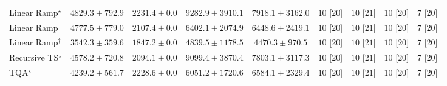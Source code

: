 \begin{tabular}{l|cccc|cccc|}
Linear Ramp$^\star$ & {\cellcolor[HTML]{97B7D7}} \color[HTML]{000000} $4829.3\pm 792.9$ & {\cellcolor[HTML]{F5EEF6}} \color[HTML]{000000} $2231.4\pm 0.0$ & {\cellcolor[HTML]{023858}} \color[HTML]{F1F1F1} $9282.9\pm 3910.1$ & {\cellcolor[HTML]{04649D}} \color[HTML]{F1F1F1} $7918.1\pm 3162.0$ & {\cellcolor[HTML]{49006A}} \color[HTML]{F1F1F1} $10$ [$20$] & {\cellcolor[HTML]{49006A}} \color[HTML]{F1F1F1} $10$ [$21$] & {\cellcolor[HTML]{49006A}} \color[HTML]{F1F1F1} $10$ [$20$] & {\cellcolor[HTML]{FFF7F3}} \color[HTML]{000000} $7$ [$20$] \\
Linear Ramp & {\cellcolor[HTML]{9AB8D8}} \color[HTML]{000000} $4777.5\pm 779.0$ & {\cellcolor[HTML]{F7F0F7}} \color[HTML]{000000} $2107.4\pm 0.0$ & {\cellcolor[HTML]{3991C1}} \color[HTML]{F1F1F1} $6402.1\pm 2074.9$ & {\cellcolor[HTML]{358FC0}} \color[HTML]{F1F1F1} $6448.6\pm 2419.1$ & {\cellcolor[HTML]{49006A}} \color[HTML]{F1F1F1} $10$ [$20$] & {\cellcolor[HTML]{49006A}} \color[HTML]{F1F1F1} $10$ [$21$] & {\cellcolor[HTML]{49006A}} \color[HTML]{F1F1F1} $10$ [$20$] & {\cellcolor[HTML]{FFF7F3}} \color[HTML]{000000} $7$ [$20$] \\
Linear Ramp$^\dagger$ & {\cellcolor[HTML]{D2D3E7}} \color[HTML]{000000} $3542.3\pm 359.6$ & {\cellcolor[HTML]{FDF5FA}} \color[HTML]{000000} $1847.2\pm 0.0$ & {\cellcolor[HTML]{97B7D7}} \color[HTML]{000000} $4839.5\pm 1178.5$ & {\cellcolor[HTML]{A9BFDC}} \color[HTML]{000000} $4470.3\pm 970.5$ & {\cellcolor[HTML]{49006A}} \color[HTML]{F1F1F1} $10$ [$20$] & {\cellcolor[HTML]{49006A}} \color[HTML]{F1F1F1} $10$ [$21$] & {\cellcolor[HTML]{49006A}} \color[HTML]{F1F1F1} $10$ [$20$] & {\cellcolor[HTML]{FFF7F3}} \color[HTML]{000000} $7$ [$20$] \\
Recursive TS$^\star$ & {\cellcolor[HTML]{A5BDDB}} \color[HTML]{000000} $4578.2\pm 720.8$ & {\cellcolor[HTML]{F8F1F8}} \color[HTML]{000000} $2094.1\pm 0.0$ & {\cellcolor[HTML]{023E62}} \color[HTML]{F1F1F1} $9099.4\pm 3870.4$ & {\cellcolor[HTML]{0567A1}} \color[HTML]{F1F1F1} $7803.1\pm 3117.3$ & {\cellcolor[HTML]{49006A}} \color[HTML]{F1F1F1} $10$ [$20$] & {\cellcolor[HTML]{49006A}} \color[HTML]{F1F1F1} $10$ [$21$] & {\cellcolor[HTML]{49006A}} \color[HTML]{F1F1F1} $10$ [$20$] & {\cellcolor[HTML]{FFF7F3}} \color[HTML]{000000} $7$ [$20$] \\
TQA$^\star$ & {\cellcolor[HTML]{B4C4DF}} \color[HTML]{000000} $4239.2\pm 561.7$ & {\cellcolor[HTML]{F5EEF6}} \color[HTML]{000000} $2228.6\pm 0.0$ & {\cellcolor[HTML]{509AC6}} \color[HTML]{F1F1F1} $6051.2\pm 1720.6$ & {\cellcolor[HTML]{2F8BBE}} \color[HTML]{F1F1F1} $6584.1\pm 2329.4$ & {\cellcolor[HTML]{49006A}} \color[HTML]{F1F1F1} $10$ [$20$] & {\cellcolor[HTML]{49006A}} \color[HTML]{F1F1F1} $10$ [$21$] & {\cellcolor[HTML]{49006A}} \color[HTML]{F1F1F1} $10$ [$20$] & {\cellcolor[HTML]{FFF7F3}} \color[HTML]{000000} $7$ [$20$] \\

\end{tabular}
